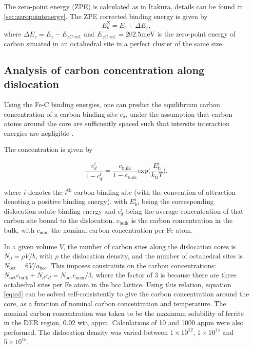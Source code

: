 \documentclass[a4paper,11pt]{article}
\begin{document}
The zero-point energy (ZPE) is calculated as in Itakura, details can be found in \ref{sec:zeropointenergy}. 
The ZPE corrected binding energy is given by 
\[ E^{\text{Z}}_{b} = E_b + \Delta E_z,  \]
where \(\Delta E_z = E_z - E_{z\text{C ref.}}\) and \(E_{z\text{C ref.}} = 202.5 \text{meV}\) is the zero-point energy of carbon
situated in an octahedral site in a perfect cluster of the same size. 

\subsection{Analysis of carbon concentration along dislocation}
\label{sec:org0139706}

Using the Fe-C binding energies, one can predict the equilibrium carbon concentration of a carbon
binding site \(c_d\), under the assumption that carbon atoms around the core are sufficiently spaced such that intersite
interaction energies are negligible \cite{Ventelon2015}.

The concentration is given by 

\begin{equation}
\frac{ c_d^{i} }{1 -  c_d^{i} } = \frac{ c_{\text{bulk}}^{} }{1 - c_{\text{bulk}} } \text{exp} \Big( 
\frac{E_{\text{b}}^i}{k_{\text{B}}T}  \Big),    \label{eq:cd}
\end{equation}


where \(i\) denotes the \(i^{\text{th}}\) carbon binding site (with the convention of attraction
denoting a positive binding energy), with \(E_{\text{b}}^{i}\), being the
corresponding dislocation-solute binding energy and \(c_d^{i}\) being the average concentration of that carbon
site bound to the dislocation. \(c_{\text{bulk}}^{}\) is the carbon concentration in the bulk, with
\(c_{\text{nom}}^{}\) the nominal carbon concentration per Fe atom.


In a given volume \(V\), the number of carbon sites along the dislocation cores is \(N_d = \rho V/b\),
with \(\rho\) the dislocation density, and the number of octahedral sites is \(N_{\text{oct}} =
    6V/a_{\text{bcc}}\). This imposes constraints on the carbon concentrations: \(N_{\text{oct}}
    c_{\text{bulk}}^{} + N_d c_d = N_{\text{oct}} c_{\text{nom}}/3\), where the factor of 3 is because there are
three octahedral sites per Fe atom in the bcc lattice. Using this relation, equation \ref{eq:cd}
can be solved self-consistently to give the carbon concentration around the core, as a
function of nominal carbon concentration and temperature. The nominal carbon concentration was
taken to be the maximum solubility of ferrite in the DER region, 0.02 wt$\backslash$%
appm. Calculations of 10 and 1000 appm were also performed. The dislocation density was varied
between \(1\times10^{12}\), \(1\times10^{14}\) and \(5\times10^{15}\).
\end{document}
